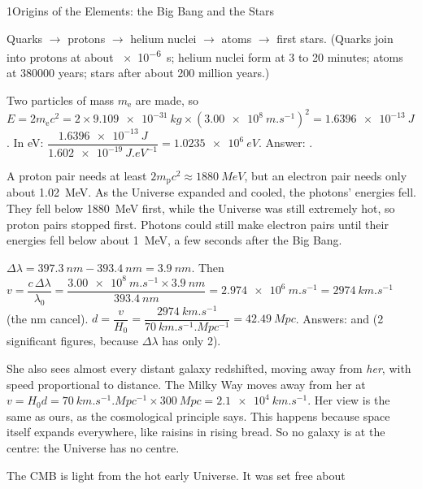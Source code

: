 \begin{chapteranswers}{1}{Origins of the Elements: the Big Bang and the Stars}
  \item Quarks $\to$ protons $\to$ helium nuclei $\to$ atoms $\to$ first stars.
        (Quarks join into protons at about \qty{e-6}{s}; helium nuclei form at 3 to 20
        minutes; atoms at \num{380000} years; stars after about 200 million years.)
  \item Two particles of mass $m_\mathrm{e}$ are made, so
        $E = 2m_\mathrm{e}c^2 = 2 \times \qty{9.109e-31}{kg} \times (\qty{3.00e8}{m.s^{-1}})^2
        = \qty{1.6396e-13}{J}$.
        In eV: $\dfrac{\qty{1.6396e-13}{J}}{\qty{1.602e-19}{J.eV^{-1}}} = \qty{1.0235e6}{eV}$.
        Answer: .
  \item A proton pair needs at least $2m_\mathrm{p}c^2 \approx \qty{1880}{MeV}$, but an
        electron pair needs only about \qty{1.02}{MeV}. As the Universe expanded and
        cooled, the photons' energies fell. They fell below \qty{1880}{MeV} first, while
        the Universe was still extremely hot, so proton pairs stopped first. Photons
        could still make electron pairs until their energies fell below about
        \qty{1}{MeV}, a few seconds after the Big Bang.
  \item $\Delta\lambda = \qty{397.3}{nm} - \qty{393.4}{nm} = \qty{3.9}{nm}$. Then
        $v = \dfrac{c\,\Delta\lambda}{\lambda_0}
        = \dfrac{\qty{3.00e8}{m.s^{-1}} \times \qty{3.9}{nm}}{\qty{393.4}{nm}}
        = \qty{2.974e6}{m.s^{-1}} = \qty{2974}{km.s^{-1}}$ (the nm cancel).
        $d = \dfrac{v}{H_0} = \dfrac{\qty{2974}{km.s^{-1}}}{\qty{70}{km.s^{-1}.Mpc^{-1}}}
        = \qty{42.49}{Mpc}$.
        Answers:  and 
        (2 significant figures, because $\Delta\lambda$ has only 2).
  \item She also sees almost every distant galaxy redshifted, moving away from
        \emph{her}, with speed proportional to distance. The Milky Way moves away from
        her at $v = H_0 d = \qty{70}{km.s^{-1}.Mpc^{-1}} \times \qty{300}{Mpc}
        = \qty{2.1e4}{km.s^{-1}}$. Her view is the same as ours, as the cosmological
        principle says. This happens because space itself expands everywhere, like
        raisins in rising bread. So no galaxy is at the centre: the Universe has no
        centre.
  \item The CMB is light from the hot early Universe. It was set free about

\end{chapteranswers}
